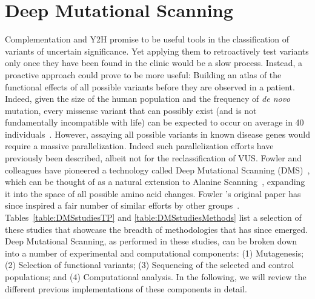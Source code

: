 \section{Deep Mutational Scanning}

Complementation and Y2H promise to be useful tools in the classification of variants of uncertain significance. Yet applying them to retroactively test variants only once they have been found in the clinic would be a slow process. Instead, a proactive approach could prove to be more useful: Building an atlas of the functional effects of all possible variants before they are observed in a patient. Indeed, given the size of the human population and the frequency of \textit{de novo} mutation, every missense variant that can possibly exist (and is not fundamentally incompatible with life) can be expected to occur on average in 40 individuals~. However, assaying all possible variants in known disease genes would require a massive parallelization. Indeed such parallelization efforts have previously been described, albeit not for the reclassification of VUS. Fowler and colleagues have pioneered a technology called Deep Mutational Scanning (DMS)~\cite{fowler_high-resolution_2010}, which can be thought of as a natural extension to Alanine Scanning~\cite{cunningham_high-resolution_1989}, expanding it into the space of all possible amino acid changes. Fowler \etal's original paper has since inspired a fair number of similar efforts by other groups~\cite{ernst_coevolution_2010,hietpas_experimental_2011,fujino_robust_2012,adkar_protein_2012,mclaughlin_jr_spatial_2012,schlinkmann_critical_2012,whitehead_optimization_2012,traxlmayr_construction_2012,wu_systematic_2013,roscoe_analyses_2013,starita_activity-enhancing_2013,procko_computational_2013,tinberg_computational_2013,jiang_latent_2013,kim_high-throughput_2013,melamed_deep_2013,forsyth_deep_2013,wagenaar_resistance_2014,firnberg_comprehensive_2014,olson_comprehensive_2014,melnikov_comprehensive_2014,bloom_experimentally_2014,thyagarajan_inherent_2014,stiffler_evolvability_2015,doud_site-specific_2015,kitzman_massively_2015,starita_massively_2015,mishra_systematic_2016,doud_accurate_2016,mavor_determination_2016,majithia_prospective_2016}. Tables~\ref{table:DMSstudiesTP} and \ref{table:DMSstudiesMethods} list a selection of these studies that showcase the breadth of methodologies that has since emerged. 
Deep Mutational Scanning, as performed in these studies, can be broken down into a number of experimental and computational components: (1) Mutagenesis; (2) Selection of functional variants; (3) Sequencing of the selected and control populations; and (4) Computational analysis. In the following, we will review the different previous implementations of these components in detail.


